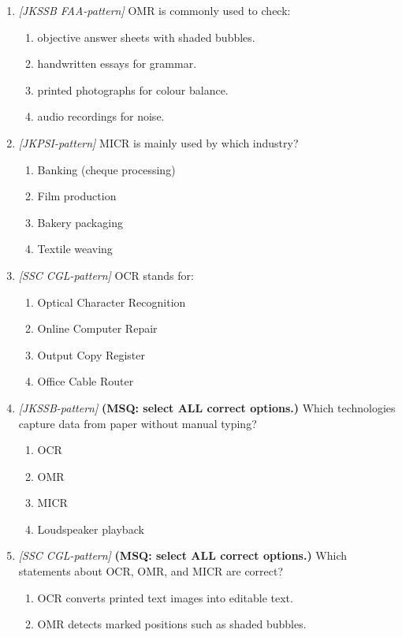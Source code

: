 \begin{enumerate}[label=\textbf{Q\arabic*.}, leftmargin=*]
\item \textit{[JKSSB FAA-pattern]} OMR is commonly used to check:
  \begin{enumerate}[label=\Alph*.]
    \item objective answer sheets with shaded bubbles.
    \item handwritten essays for grammar.
    \item printed photographs for colour balance.
    \item audio recordings for noise.
  \end{enumerate}
\item \textit{[JKPSI-pattern]} MICR is mainly used by which industry?
  \begin{enumerate}[label=\Alph*.]
    \item Banking (cheque processing)
    \item Film production
    \item Bakery packaging
    \item Textile weaving
  \end{enumerate}
\item \textit{[SSC CGL-pattern]} OCR stands for:
  \begin{enumerate}[label=\Alph*.]
    \item Optical Character Recognition
    \item Online Computer Repair
    \item Output Copy Register
    \item Office Cable Router
  \end{enumerate}
\item \textit{[JKSSB-pattern]} \textbf{(MSQ: select ALL correct options.)} Which technologies capture data from paper without manual typing?
  \begin{enumerate}[label=\Alph*.]
    \item OCR
    \item OMR
    \item MICR
    \item Loudspeaker playback
  \end{enumerate}
\item \textit{[SSC CGL-pattern]} \textbf{(MSQ: select ALL correct options.)} Which statements about OCR, OMR, and MICR are correct?
  \begin{enumerate}[label=\Alph*.]
    \item OCR converts printed text images into editable text.
    \item OMR detects marked positions such as shaded bubbles.

\end{enumerate}
\end{enumerate}
